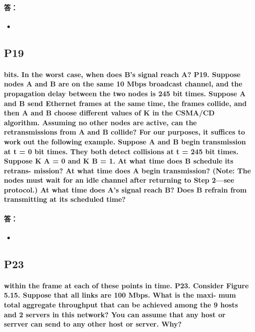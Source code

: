 \documentclass[a4paper]{ctexart}
\begin{document}
\paragraph*{答：} 
\begin{itemize}
    \item 
\end{itemize}

\subsection*{P19}
\paragraph*{bits. In the worst case, when does B’s signal reach A?
P19. Suppose nodes A and B are on the same 10 Mbps broadcast channel, and
the propagation delay between the two nodes is 245 bit times. Suppose A
and B send Ethernet frames at the same time, the frames collide, and then
A and B choose different values of K in the CSMA/CD algorithm. Assuming no other nodes are active, can the retransmissions from A and B collide? For
our purposes, it suffices to work out the following example. Suppose A and B
begin transmission at t = 0 bit times. They both detect collisions at t = 245 bit
times. Suppose K A = 0 and K B = 1. At what time does B schedule its retrans-
mission? At what time does A begin transmission? (Note: The nodes must wait
for an idle channel after returning to Step 2—see protocol.) At what time does
A’s signal reach B? Does B refrain from transmitting at its scheduled time?\\}
\paragraph*{答：} 
\begin{itemize}
    \item 
\end{itemize}

\subsection*{P23}
\paragraph*{within the frame at each of these points in time.
P23. Consider Figure 5.15. Suppose that all links are 100 Mbps. What is the maxi-
mum total aggregate throughput that can be achieved among the 9 hosts and
2 servers in this network? You can assume that any host or serrver can send
to any other host or server. Why?\\}
\end{document}
